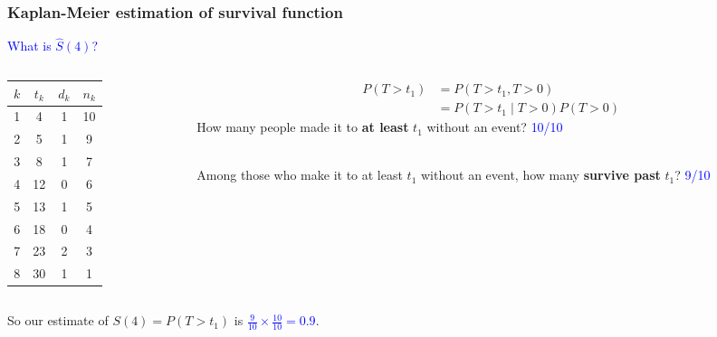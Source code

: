 \documentclass[10pt,t]{beamer}
\begin{document}
\begin{frame}
\frametitle{Kaplan-Meier estimation of survival function}

	\vspace{-5 mm}

\textcolor{blue}{What is $\widehat{S}(4)$?}

\medskip

\begin{columns}
	\begin{column}{0.3\textwidth}
		\begin{center}
\begin{tabular}{|c|c|c|c|}
	\hline
	$k$ & $t_k$ & $d_k$ & $n_k$ \\
	\hline
	1 & 4 & 1 & 10 \\
	2& 5 & 1 & 9 \\
	3& 8 & 1 & 7 \\
	4&12 & 0 & 6 \\
	5&13 & 1 & 5 \\
	6&18 & 0 & 4 \\
	7&23 & 2 & 3 \\
	8&30 & 1 & 1 \\
	\hline
\end{tabular}
	\end{center}
	\end{column}
	\begin{column}{0.7\textwidth}  %
		\begin{align*}
			P(T > t_1) &= P(T > t_1, T > 0) \\
			&= P(T > t_1 \mid T > 0)P(T > 0)
		\end{align*}
		How many people made it to \textbf{at least} $t_1$ without an event?   \textcolor{blue}{10/10}
		\\ ~\ 
		
		Among those who make it to at least $t_1$ without an event, how many \textbf{survive past} $t_1$?   \textcolor{blue}{9/10} 
	\end{column}
\end{columns}
\vspace{0.5cm}
So our estimate of $S(4) = P(T > t_1)$ is \textcolor{blue}{$\frac{9}{10} \times \frac{10}{10} = 0.9$}.
\end{frame}
\end{document}
